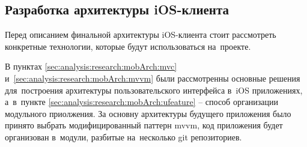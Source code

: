 \subsection{Разработка архитектуры iOS-клиента}
\label{sec:development:arch:ios}

Перед описанием финальной архитектуры iOS-клиента стоит рассмотреть конкретные технологии, которые будут использоваться на~проекте.








В пунктах \ref{sec:analysis:research:mobArch:mvc} и~\ref{sec:analysis:research:mobArch:mvvm} были рассмотренны основные решения для~построения архитектуры пользовательского интерфейса в~iOS приложениях, а~в~пункте \ref{sec:analysis:research:mobArch:ufeature} -- способ организации модульного приолжения. За основну архитектуры будущего приложения было принято выбрать модифицированный паттерн \gls{mvvm}, код приложения будет организован в~модули, разбитые на~несколько git репозиториев. 